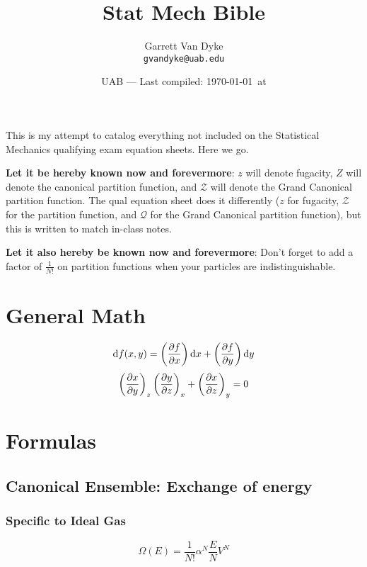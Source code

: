 \documentclass{article}
\title{Stat Mech Bible} %
\author{Garrett Van Dyke\\ \texttt{gvandyke@uab.edu}} %
\date{UAB --- Last compiled: \today\ at \currenttime} %
\begin{document}
\maketitle %



This is my attempt to catalog everything not included on the Statistical Mechanics qualifying exam equation sheets. Here we go. \medskip

\textbf{Let it be hereby known now and forevermore}: $z$ will denote fugacity, $Z$ will denote the canonical partition function, and $\mathcal{Z}$ will denote the Grand Canonical partition function. The qual equation sheet does it differently ($z$ for fugacity, $\mathcal{Z}$ for the partition function, and $\mathcal{Q}$ for the Grand Canonical partition function), but this is written to match in-class notes.\medskip

\textbf{Let it also hereby be known now and forevermore}: Don't forget to add a factor of $\frac{1}{N!}$ on partition functions when your particles are indistinguishable.

\section{General Math}
\begin{equation}
	\dif f(x,y)= \left(\pdv{f}{x}\right)\dif x + \left(\pdv{f}{y}\right)\dif y
\end{equation}
\begin{equation}
	\left(\pdv{x}{y}\right)_z\left(\pdv{y}{z}\right)_x+\left(\pdv{x}{z}\right)_y=0
\end{equation}


\section{Formulas}
\subsection{Canonical Ensemble: \normalfont Exchange of energy}
\subsubsection{Specific to Ideal Gas}
\begin{equation}
	\Omega(E)=\frac{1}{N!}\alpha^N \frac{E}{N}V^N
\end{equation}
\end{document}
